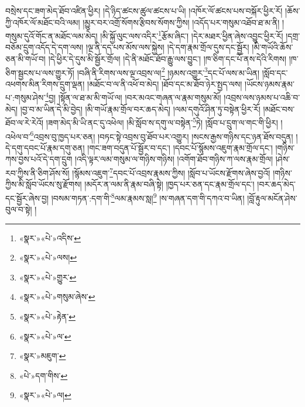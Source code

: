བསྲེས་དང་ཟག་མེད་ཐོབ་འཛིན་ཕྱིར། །དེ་ཉིད་ཚངས་ཚུལ་ཚངས་པ་ཡི། །འཁོར་ལོ་ཚངས་པས་བསྐོར་ཕྱིར་རོ། །ཆོས་ཀྱི་འཁོར་ལོ་མཐོང་བའི་ལམ། །མྱུར་བར་འགྲོ་སོགས་རྩིབས་སོགས་ཀྱིས། །འདོད་པར་གསུམ་འཐོབ་ཐ་མ་ནི། །གསུམ་དུའོ་གོང་ན་མཐོང་ལམ་མེད། །མི་སྐྱོ་ལུང་ལས་འདིར་\footnote{«སྣར་»«པེ་»འདིས་}རྩོམ་ཞིང་། །དེར་མཐར་ཕྱིན་ཞེས་འབྱུང་ཕྱིར་རོ། །དགྲ་བཅོམ་དྲུག་འདོད་དེ་དག་ལས། །ལྔ་ནི་དད་པས་མོས་ལས་སྐྱེས། །དེ་དག་རྣམ་གྲོལ་དུས་དང་སྦྱོར། །མི་གཡོའི་ཆོས་ཅན་མི་གཡོ་བ། །དེ་ཕྱིར་དེ་དུས་མི་སྦྱོར་གྲོལ། །དེ་ནི་མཐོང་ཐོབ་རྒྱུ་ལས་བྱུང་། །ཁ་ཅིག་དང་པོ་ནས་དེའི་རིགས། །ཁ་ཅིག་སྦྱངས་པ་ལས་གྱུར་ཏོ། །བཞི་ནི་རིགས་ལས་ལྔ་འབྲས་ལ།\footnote{«སྣར་»«པེ་»ལས།} །ཉམས་འགྱུར་\footnote{«སྣར་»«པེ་»གྱུར་}དང་པོ་ལས་མ་ཡིན། །སློབ་དང་འཕགས་མིན་རིགས་དྲུག་ལྡན། །མཐོང་བ་ལ་ནི་འཕོ་བ་མེད། །ཐོབ་དང་མ་ཐོབ་ཉེར་སྤྱད་ལས། །ཡོངས་ཉམས་རྣམ་པ་:གསུམ་ཤེས་\footnote{«སྣར་»«པེ་»གསུམ་ཞེས་}བྱ། །སྟོན་ལ་ཐ་མ་མི་གཡོ་ལ། །བར་མའང་གཞན་ལ་རྣམ་གསུམ་མོ། །འབྲས་ལས་ཉམས་པ་འཆི་བ་མེད། །བྱ་བ་མ་ཡིན་དེ་མི་བྱེད། །མི་གཡོ་རྣམ་གྲོལ་བར་ཆད་མེད། །ལམ་དགུའོ་ཤིན་ཏུ་བསྟེན་ཕྱིར་རོ། །མཐོང་བས་ཐོབ་ལ་རེ་རེའོ། །ཟག་མེད་མི་ཡི་ནང་དུ་འཕེལ། །མི་སློབ་ས་དགུ་ལ་བསྟེན་\footnote{«སྣར་»«པེ་»རྟེན་}ཏེ། །སློབ་པ་དྲུག་ལ་གང་གི་ཕྱིར། །འཕེལ་བ་\footnote{«སྣར་»«པེ་»ལ་}འབྲས་བུ་ཁྱད་པར་ཅན། །བཏང་སྟེ་འབྲས་བུ་ཐོབ་པར་འགྱུར། །སངས་རྒྱས་གཉིས་དང་ཉན་ཐོས་བདུན། །དེ་དགུ་དབང་པོ་རྣམ་དགུ་ཅན། །གང་ཟག་བདུན་པོ་སྦྱོར་བ་དང་། །དབང་པོ་སྙོམས་འཇུག་རྣམ་གྲོལ་དང་། །གཉིས་ཀས་བྱས་པའོ་དེ་དག་དྲུག །འདི་ལྟར་ལམ་གསུམ་ལ་གཉིས་གཉིས། །འགོག་ཐོབ་གཉིས་ཀ་ལས་རྣམ་གྲོལ། །ཤེས་རབ་ཀྱིས་ནི་ཅིག་ཤོས་སོ། །སྙོམས་འཇུག་\footnote{«སྣར་»མཇུག་}དབང་པོ་འབྲས་རྣམས་ཀྱིས། །སློབ་པ་ཡོངས་རྫོགས་ཞེས་བྱའོ། །གཉིས་ཀྱིས་མི་སློབ་ཡོངས་སུ་རྫོགས། །མདོར་ན་ལམ་ནི་རྣམ་བཞི་སྟེ། །ཁྱད་པར་ཅན་དང་རྣམ་གྲོལ་དང་། །བར་ཆད་མེད་དང་སྦྱོར་ཞེས་བྱ། །བསམ་གཏན་:དག་གི་\footnote{«པེ་»དག་གིས་}ལམ་རྣམས་སླ།\footnote{«སྣར་»«པེ་»ལ།} །ས་གཞན་དག་གི་དཀའ་བ་ཡིན། །བློ་རྟུལ་མངོན་ཤེས་བུལ་བ་སྟེ། །
